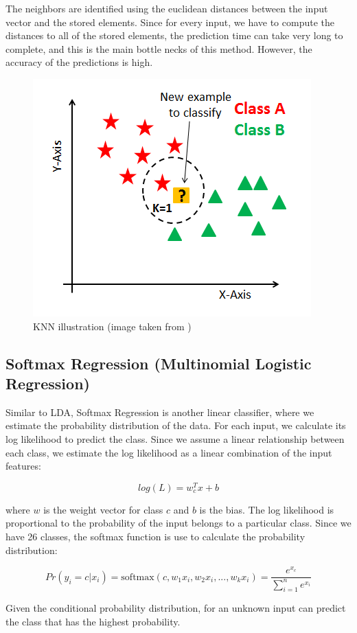 \documentclass[12,]{article}
\begin{document}
The neighbors are identified using the euclidean distances between the
input vector and the stored elements. Since for every input, we have to
compute the distances to all of the stored elements, the prediction time
can take very long to complete, and this is the main bottle necks of
this method. However, the accuracy of the predictions is high.

\begin{figure}[h]
  \begin{center}
  \includegraphics[width=0.4\columnwidth]{./KNN-illustration.png}
  \end{center}
\caption{KNN illustration (image taken from \cite{knn-img})}
\end{figure}

\hypertarget{softmax-regression-multinomial-logistic-regression}{%
\subsection{Softmax Regression (Multinomial Logistic
Regression)}\label{softmax-regression-multinomial-logistic-regression}}

Similar to LDA, Softmax Regression \cite{lr} is another linear
classifier, where we estimate the probability distribution of the data.
For each input, we calculate its log likelihood to predict the class.
Since we assume a linear relationship between each class, we estimate
the log likelihood as a linear combination of the input features:

\[
log(L) = w_c^T x + b
\]

where \(w\) is the weight vector for class \(c\) and \(b\) is the bias.
The log likelihood is proportional to the probability of the input
belongs to a particular class. Since we have 26 classes, the softmax
function is use to calculate the probability distribution:

\[
Pr(y_i = c| x_i) = \text{softmax}(c, w_1 x_i, w_2 x_i, ..., w_k x_i) = \frac{e^{x_c}}{\sum_{i=1}^{n} e^{x_i}}
\]

Given the conditional probability distribution, for an unknown input can
predict the class that has the highest probability.
\end{document}
